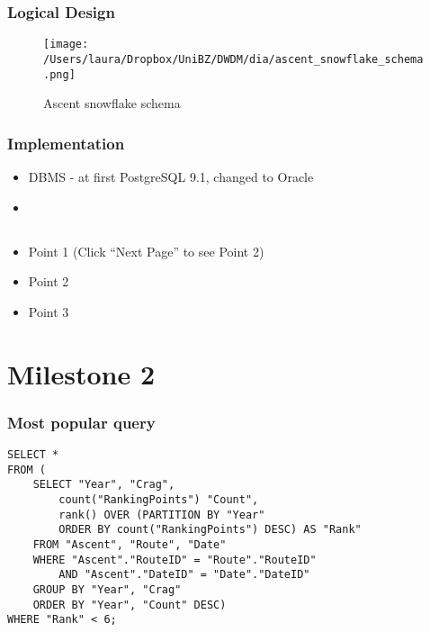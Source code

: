 \documentclass[]{beamer}
\begin{document}
\begin{frame}
  \frametitle{Logical Design}   %

  \begin{figure}[ht!]
  \centering 
  \texttt{[image: /Users/laura/Dropbox/UniBZ/DWDM/dia/ascent\_snowflake\_schema.png]}
  \caption{Ascent snowflake schema}
  \label{fig:ascent_snowflake_schema}
  \end{figure}

\end{frame}

\begin{frame}
  \frametitle{Implementation}   %

  \begin{itemize}
  \item DBMS - at first PostgreSQL 9.1, changed to Oracle
  \item 
  \end{itemize}

\end{frame}

\subsection{}

\begin{frame}
  \frametitle{}   %

  \begin{itemize}
  \item<1-> Point 1 (Click ``Next Page'' to see Point 2) %
  \item<2-> Point 2  %
  \item<3-> Point 3
  \end{itemize}
\end{frame}


\section{Milestone 2}

\begin{frame}[fragile]
\frametitle{Most popular query}


\begin{lstlisting}
SELECT * 
FROM (
	SELECT "Year", "Crag", 
		count("RankingPoints") "Count", 
		rank() OVER (PARTITION BY "Year"
		ORDER BY count("RankingPoints") DESC) AS "Rank" 
	FROM "Ascent", "Route", "Date" 
	WHERE "Ascent"."RouteID" = "Route"."RouteID"
		AND "Ascent"."DateID" = "Date"."DateID" 
	GROUP BY "Year", "Crag"
	ORDER BY "Year", "Count" DESC) 
WHERE "Rank" < 6;
\end{lstlisting}
\end{frame}
\end{document}
